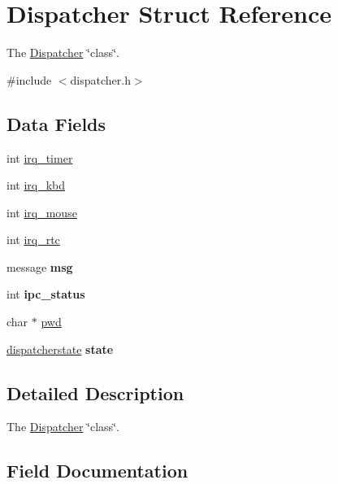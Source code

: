 \hypertarget{struct_dispatcher}{}\section{Dispatcher Struct Reference}
\label{struct_dispatcher}


The \hyperlink{struct_dispatcher}{Dispatcher} \char`\"{}class\char`\"{}.  




{\ttfamily \#include $<$dispatcher.\+h$>$}

\subsection*{Data Fields}
\begin{DoxyCompactItemize}
\item 
int \hyperlink{struct_dispatcher_a1d02e668b2cd1d4d633b562f437b8a4c}{irq\+\_\+timer}
\item 
int \hyperlink{struct_dispatcher_addcb3317227ee8bbc0304d8f3755cf21}{irq\+\_\+kbd}
\item 
int \hyperlink{struct_dispatcher_a899f4e59ee15429018efee9d38b533f1}{irq\+\_\+mouse}
\item 
int \hyperlink{struct_dispatcher_ac41513eff21d0a1e7c633f653c81eb0e}{irq\+\_\+rtc}
\item 
\hypertarget{struct_dispatcher_a9a27098ef2c3f4770fd8d4102a089c35}{}\label{struct_dispatcher_a9a27098ef2c3f4770fd8d4102a089c35} 
message {\bfseries msg}
\item 
\hypertarget{struct_dispatcher_ab9f863ebaa3805a6e366e055cd35626a}{}\label{struct_dispatcher_ab9f863ebaa3805a6e366e055cd35626a} 
int {\bfseries ipc\+\_\+status}
\item 
char $\ast$ \hyperlink{struct_dispatcher_a4be832ac49cb1384b79b9423028f1d54}{pwd}
\item 
\hypertarget{struct_dispatcher_ae3eef9568d40d16d1d14078d5bb9f069}{}\label{struct_dispatcher_ae3eef9568d40d16d1d14078d5bb9f069} 
\hyperlink{group__dispatcher_gafe31418b86c6754be94c8e79cfeed813}{dispatcherstate} {\bfseries state}
\end{DoxyCompactItemize}


\subsection{Detailed Description}
The \hyperlink{struct_dispatcher}{Dispatcher} \char`\"{}class\char`\"{}. 

\subsection{Field Documentation}
\hypertarget{struct_dispatcher_addcb3317227ee8bbc0304d8f3755cf21}{}\label{struct_dispatcher_addcb3317227ee8bbc0304d8f3755cf21} 
